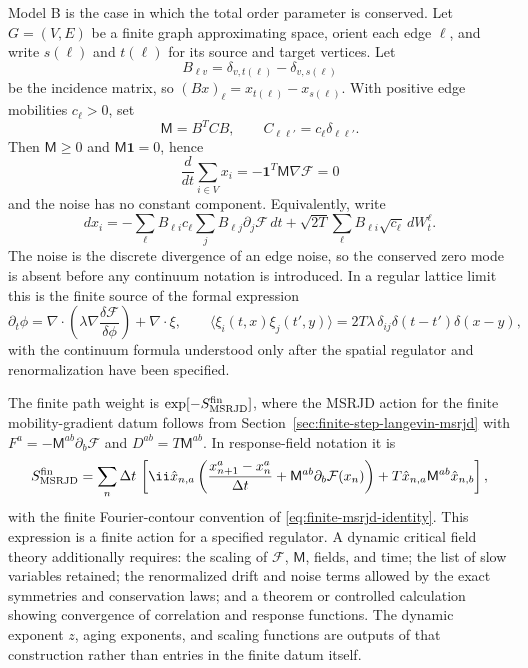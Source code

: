Model B is the case in which the total order parameter is conserved.  Let
\(G=(V,E)\) be a finite graph approximating space, orient each edge
\(\ell\), and write \(s(\ell)\) and \(t(\ell)\) for its source and target
vertices.  Let
\[
  B_{\ell v}=\delta_{v,t(\ell)}-\delta_{v,s(\ell)}
\]
be the incidence matrix, so \((Bx)_\ell=x_{t(\ell)}-x_{s(\ell)}\).  With
positive edge mobilities \(c_\ell>0\), set
\begin{equation}
  \mathsf M=B^T C B,
  \qquad
  C_{\ell\ell'}=c_\ell\delta_{\ell\ell'} .
  \label{eq:finite-model-b-mobility}
\end{equation}
Then \(\mathsf M\ge0\) and \(\mathsf M\mathbf1=0\), hence
\[
  \frac{d}{dt}\sum_{i\in V}x_i
  =
  -\mathbf1^T\mathsf M\nabla\mathcal F=0
\]
and the noise has no constant component.  Equivalently, write
\[
  dx_i
  =
  -\sum_{\ell}B_{\ell i} c_\ell
  \sum_j B_{\ell j}\partial_j\mathcal F\,dt
  +\sqrt{2T}\sum_\ell B_{\ell i}\sqrt{c_\ell}\,dW^\ell_t .
\]
The noise is the discrete divergence of an edge noise, so the conserved
zero mode is absent before any continuum notation is introduced.  In a
regular lattice limit this is the finite source of the formal expression
\[
  \partial_t\phi
  =
  \nabla\cdot
  \left(
    \lambda\nabla\frac{\delta\mathcal F}{\delta\phi}
  \right)
  +\nabla\cdot \xi ,
  \qquad
  \langle\xi_i(t,x)\xi_j(t',y)\rangle
  =
  2T\lambda\,\delta_{ij}\delta(t-t')\delta(x-y),
\]
with the continuum formula understood only after the spatial regulator and
renormalization have been specified.

The finite path weight is \(\exp[-S_{\rm MSRJD}^{\rm fin}]\), where the
MSRJD action for the finite mobility-gradient datum follows from
Section~\ref{sec:finite-step-langevin-msrjd} with
\(F^a=-\mathsf M^{ab}\partial_b\mathcal F\) and \(D^{ab}=T\mathsf M^{ab}\).
In response-field notation it is
\begin{equation}
  S_{\rm MSRJD}^{\rm fin}
  =
  \sum_n
  \Delta t\,
  \left[
    \ii\hat x_{n,a}
    \left(
      \frac{x_{n+1}^a-x_n^a}{\Delta t}
      +\mathsf M^{ab}\partial_b\mathcal F(x_n)
    \right)
    +T\hat x_{n,a}\mathsf M^{ab}\hat x_{n,b}
  \right],
  \label{eq:finite-model-ab-msrjd-action}
\end{equation}
with the finite Fourier-contour convention of
\eqref{eq:finite-msrjd-identity}.  This expression is a finite action for a
specified regulator.  A dynamic critical field theory additionally requires:
the scaling of \(\mathcal F\), \(\mathsf M\), fields, and time; the list of
slow variables retained; the renormalized drift and noise terms allowed by
the exact symmetries and conservation laws; and a theorem or controlled
calculation showing convergence of correlation and response functions.  The
dynamic exponent \(z\), aging exponents, and scaling functions are outputs
of that construction rather than entries in the finite datum itself.


